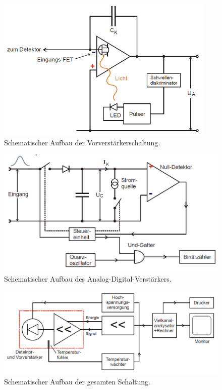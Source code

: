 \begin{figure}
	\centering
	\includegraphics[width=\linewidth-70pt,height=\textheight-70pt,keepaspectratio]{content/images/Schaltung.pdf}
	\caption{Schematischer Aufbau der Vorverstärkerschaltung\cite{V18}.}
	\label{fig:Schalt}
\end{figure}
\begin{figure}
	\centering
	\includegraphics[width=\linewidth-70pt,height=\textheight-70pt,keepaspectratio]{content/images/Schaltung2.pdf}
	\caption{Schematischer Aufbau des Analog-Digital-Verstärkers\cite{V18}.}
	\label{fig:Schalt2}
\end{figure}
\begin{figure}
	\centering
	\includegraphics[width=\linewidth-70pt,height=\textheight-70pt,keepaspectratio]{content/images/Schaltung3.pdf}
	\caption{Schematischer Aufbau der gesamten Schaltung\cite{V18}.}
	\label{fig:Schalt3}
\end{figure}
